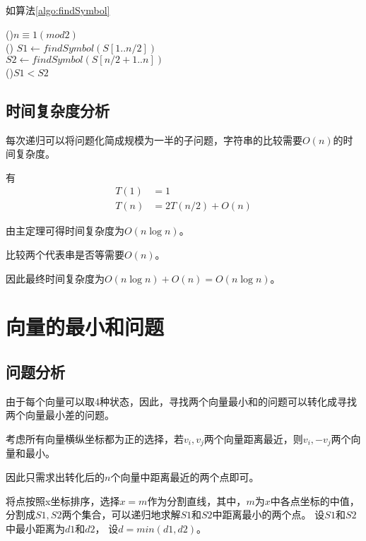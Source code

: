 如算法\ref{algo:findSymbol}

\begin{algorithm}[H]
    \caption{$findSymbol(A[1..n], B[1..m],k)$}\label{algo:findSymbol}
    \If(){$n\equiv 1 (mod 2)$}{
        \\
    }\Else(){
        $S1 \leftarrow findSymbol(S[1..n/2])$\\
        $S2 \leftarrow findSymbol(S[n/2+1 .. n])$\\
        \If(){$S1 < S2$}{
        }
    }
\end{algorithm}

\subsection*{时间复杂度分析}

每次递归可以将问题化简成规模为一半的子问题，字符串的比较需要$O(n)$的时间复杂度。

有
\begin{equation}
    \begin{aligned}
        T(1) &= 1\\
        T(n) &=2T(n/2)+O(n)
    \end{aligned}
    \nonumber
\end{equation}

由主定理可得时间复杂度为$O(n \log n)$。

比较两个代表串是否等需要$O(n)$。

因此最终时间复杂度为$O(n \log n) + O(n) = O(n \log n)$。


\section{向量的最小和问题}

\subsection*{问题分析}
由于每个向量可以取4种状态，因此，寻找两个向量最小和的问题可以转化成寻找两个向量最小差的问题。

考虑所有向量横纵坐标都为正的选择，若$v_{i}, v_{j}$两个向量距离最近，则$v_{i}, -v_{j}$两个向量和最小。

因此只需求出转化后的$n$个向量中距离最近的两个点即可。

将点按照x坐标排序，选择$x=m$作为分割直线，其中，$m$为$x$中各点坐标的中值，分割成$S1,S2$两个集合，可以递归地求解$S1$和$S2$中距离最小的两个点。
设$S1$和$S2$中最小距离为$d1$和$d2$， 设$d=min(d1,d2)$。

